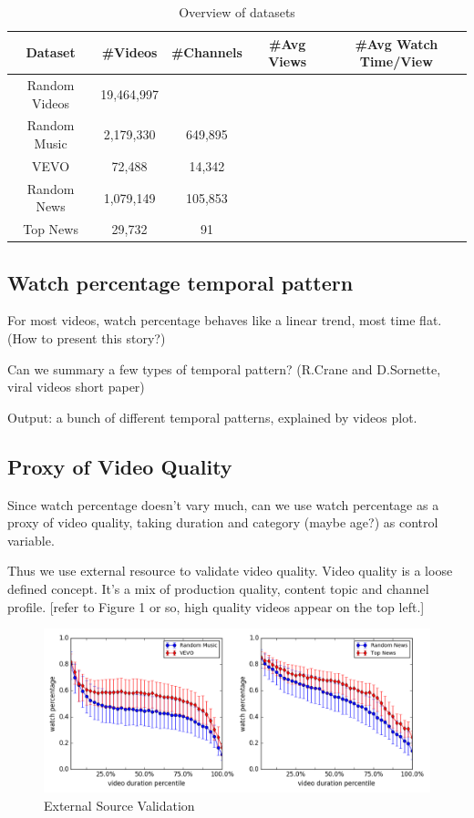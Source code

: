 \begin{table}
  \caption{Overview of datasets}
  \label{table:1}
  \begin{tabular}{ccccc}
    \toprule
    Dataset & \#Videos & \#Channels & \#Avg Views & \#Avg Watch Time/View \\
    \midrule
    Random Videos & 19,464,997 &  & \\ 
    Random Music & 2,179,330 & 649,895 & \\ 
    VEVO & 72,488 & 14,342 & \\
    Random News & 1,079,149 & 105,853 & \\
    Top News & 29,732 & 91 & \\
  \bottomrule
\end{tabular}
\end{table}

\subsection{Watch percentage temporal pattern}

For most videos, watch percentage behaves like a linear trend, most time flat. (How to present this story?)

Can we summary a few types of temporal pattern? (R.Crane and D.Sornette, viral videos short paper)

Output: a bunch of different temporal patterns, explained by videos plot.


\subsection{Proxy of Video Quality}
Since watch percentage doesn't vary much, can we use watch percentage as a proxy of video quality, taking duration and category (maybe age?) as control variable.

Thus we use external resource to validate video quality. Video quality is a loose defined concept. It's a mix of production quality, content topic and channel profile. [refer to Figure 1 or so, high quality videos appear on the top left.]

\begin{figure}
    \centering
    \includegraphics[scale=0.32]{image/external_source_comp.png}
    \caption{External Source Validation}
\end{figure}

